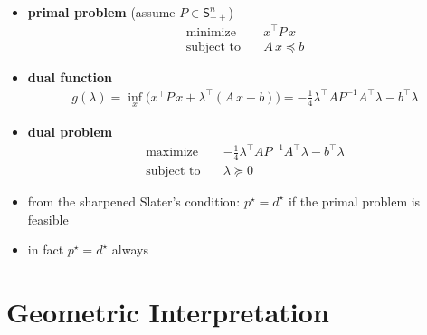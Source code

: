 \documentclass[11pt]{extarticle}
\newcommand{\ds}{\displaystyle}
\theoremstyle{definition}
\begin{document}
\begin{itemize}\setlength\itemsep{0em}
  \item {\bf primal problem} (assume $\ds P\in\mathsf{S}^n_{++}$)
    \begin{align*}
      \text{minimize}\quad & x^\top P\,x \\
      \text{subject to}\quad & A\,x \preccurlyeq b 
    \end{align*}
  \item {\bf dual function} 
    \begin{align*}
      g(\lambda) = \inf_x\big(x^\top P\,x + \lambda^\top(A\,x - b)\big) = -\frac{1}{4}\lambda^\top A P^{-1} A^\top\lambda - b^\top\lambda
    \end{align*}
  \item {\bf dual problem}
    \begin{align*}
      \text{maximize}\quad & -\frac{1}{4}\lambda^\top A P^{-1} A^\top\lambda - b^\top\lambda \\
      \text{subject to}\quad & \lambda\succcurlyeq 0 
    \end{align*}
  \item from the sharpened Slater's condition: $p^\star = d^\star$ if the primal problem is feasible
  \item in fact $p^\star = d^\star$ always
\end{itemize}

\newpage

\section*{Geometric Interpretation}
\end{document}
